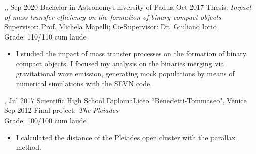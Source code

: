 \begin{experiences}
{\begin{itemize}
    \end{itemize}
    }{,,}
  \emptySeparator
  \experiencetags
    {Sep 2020}   {Bachelor in Astronomy}{University of Padua}
    {Oct 2017} 
    {Thesis: \textit{Impact of mass transfer efficiency on the formation of binary compact objects} \\
    Supervisor: Prof. Michela Mapelli; Co-Supervisor: Dr. Giuliano Iorio \\
    Grade: 110/110 cum laude  %
    }{
    \begin{itemize}
        \item  I studied the impact of mass transfer processes on the formation of binary compact objects. I focused my analysis on the binaries merging via gravitational wave emission, generating mock populations by means of numerical simulations with the SEVN code. 
   \end{itemize}
   }{,}
  \emptySeparator
    \experience
    {Jul 2017}   {Scientific High School Diploma}{Liceo ``Benedetti-Tommaseo", Venice}
    {Sep 2012} 
    {Final project: \textit{The Pleiades} \\
    Grade: 100/100 cum laude }{    
    \begin{itemize}
        \item I calculated the distance of the Pleiades open cluster with the parallax method.
    \end{itemize}
    } 
\end{experiences}
